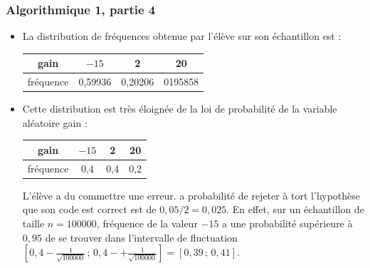 \documentclass[11pt, hyperref={urlcolor=red,%
            linkcolor=blue, %
            colorlinks=true}]{beamer}
\newcommand{\Interff}[2]{\left[#1\, ;\, #2\right]}
\begin{document}
\begin{frame}[fragile]

\frametitle{Algorithmique 1,  partie 4}
\begin{itemize}

\item La distribution de fréquences obtenue par l'élève sur son  échantillon est :

\begin{tabular}{|c|c|c|c|}
\hline 
gain & $-15$ & 2 & 20 \\ 
\hline 
fréquence & 0,59936 & 0,20206 & 0195858 \\ 
\hline 
\end{tabular} 

\pause \item  Cette distribution est très éloignée de la loi de probabilité de la variable aléatoire gain :
\begin{tabular}{|c|c|c|c|}
\hline 
gain & $-15$ & 2 & 20 \\ 
\hline 
fréquence & 0,4 & 0,4 & 0,2 \\ 
\hline 
\end{tabular} 

L'élève a du commettre une erreur. a probabilité de rejeter à tort l'hypothèse que son code est correct est de $0,05/2=0,025$. En effet, sur un échantillon de taille $n=100000$,  fréquence de la valeur $-15$ a une probabilité supérieure à $0,95$ de se trouver dans l'intervalle  de fluctuation $\Interff{0,4-\frac{1}{\sqrt{100000}}}{0,4-+\frac{1}{\sqrt{100000}}}=\Interff{0,39}{0,41}$.
\end{itemize}


\end{frame}
\end{document}
